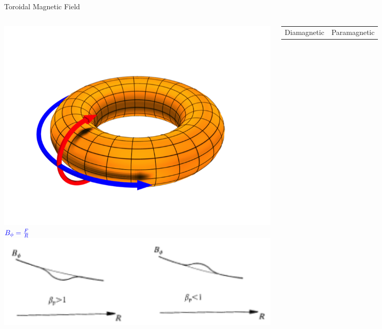 \documentclass{beamer}
\begin{document}
\begin{frame}{Toroidal Magnetic Field}
\begin{columns}
	\begin{center}
	\includegraphics[trim = 2mm 5mm 2mm 5mm, clip, width=.7\columnwidth]{torsurf.png}
	$\color{blue} B_{\phi} = \frac{F}{R} $
	\includegraphics[width=.8\columnwidth]{btor.png}
	\end{center}
	\begin{tabular}{cc}
		\small	Diamagnetic & Paramagnetic
 	\end{tabular}
\end{columns}
\end{frame}
\end{document}
